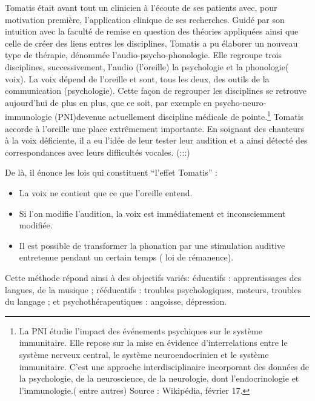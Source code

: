 Tomatis était avant tout un clinicien à l'écoute de ses patients avec,
pour motivation première, l'application clinique de ses recherches.
Guidé par son intuition avec la faculté de remise en question des
théories appliquées ainsi que celle de créer des liens entres les
disciplines, Tomatis a pu élaborer un nouveau type de thérapie, dénommée
l'audio-psycho-phonologie. Elle regroupe trois disciplines, successivement,
l'audio (l'oreille) la psychologie et la phonologie( voix). La voix
dépend de l'oreille et sont, tous les deux, des outils de la communication
(psychologie). Cette façon de regrouper les disciplines se retrouve
aujourd'hui de plus en plus, que ce soit, par exemple en psycho-neuro-immunologie
(PNI)devenue actuellement discipline médicale de pointe.\footnote{La PNI étudie l'impact des événements psychiques sur le système immunitaire.
Elle repose sur la mise en évidence d'interrelations entre le système
nerveux central, le système neuroendocrinien et le système immunitaire.
C'est une approche interdisciplinaire incorporant des données de la
psychologie, de la neuroscience, de la neurologie, dont l'endocrinologie
et l'immunologie.( entre autres) Source : Wikipédia, février 17.}
Tomatis accorde à l'oreille une place extrêmement importante. En soignant
des chanteurs à la voix déficiente, il a eu l'idée de leur tester
leur audition et a ainsi détecté des correspondances avec leurs difficultés
vocales. (:::)

De là, il énonce les lois qui constituent ``l'effet Tomatis'' : 
\begin{itemize}
\item La voix ne contient que ce que l'oreille entend.
\item Si l'on modifie l'audition, la voix est immédiatement et inconsciemment
modifiée.
\item Il est possible de transformer la phonation par une stimulation auditive
entretenue pendant un certain temps ( loi de rémanence).
\end{itemize}
Cette méthode répond ainsi à des objectifs variés: éducatifs : apprentissages
des langues, de la musique ; rééducatifs : troubles psychologiques,
moteurs, troubles du langage ; et psychothérapeutiques : angoisse,
dépression. 

